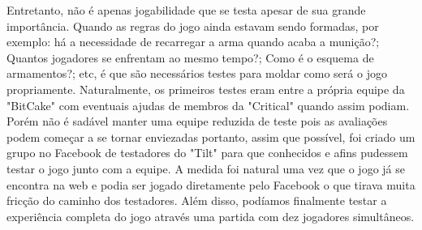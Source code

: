 Entretanto, não é apenas jogabilidade que se testa apesar de sua grande importância. Quando as regras do jogo ainda estavam sendo formadas, por exemplo: há a necessidade de recarregar a arma quando acaba a munição?; Quantos jogadores se enfrentam ao mesmo tempo?; Como é o esquema de armamentos?; etc, é que são necessários testes para moldar como será o jogo propriamente. Naturalmente, os primeiros testes eram entre a própria equipe da "BitCake" com eventuais ajudas de membros da "Critical" quando assim podiam. Porém não é sadável manter uma equipe reduzida de teste pois as avaliações podem começar a se tornar enviezadas portanto, assim que possível, foi criado um grupo no Facebook de testadores do "Tilt" para que conhecidos e afins pudessem testar o jogo junto com a equipe. A medida foi natural uma vez que o jogo já se encontra na web e podia ser jogado diretamente pelo Facebook o que tirava muita fricção do caminho dos testadores. Além disso, podíamos finalmente testar a experiência completa do jogo através uma partida com dez jogadores simultâneos.
